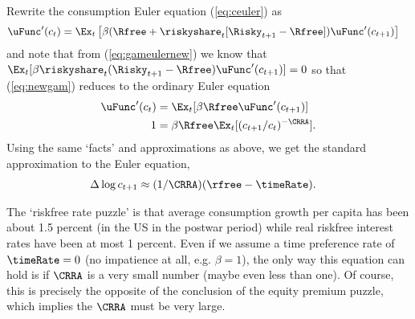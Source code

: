 \documentclass{handout}
\begin{document}

Rewrite the consumption Euler equation (\ref{eq:ceuler}) as 
\begin{equation}\begin{gathered}\begin{aligned}
      \uFunc^{\prime}(c_{t}) & =  \Ex_{t}\left[\beta (\Rfree  + \riskyshare_{t} [\Risky_{t+1} - \Rfree])\uFunc^{\prime}({c}_{t+1})\right] \label{eq:newgam}
    \end{aligned}\end{gathered}\end{equation}
and note that from (\ref{eq:gameulernew}) we know that $\Ex_{t}[\beta 
\riskyshare_{t}(\Risky_{t+1}-\Rfree)\uFunc^{\prime}({c}_{t+1})] = 0$ so that 
(\ref{eq:newgam}) reduces to the ordinary Euler equation
\begin{equation}\begin{gathered}\begin{aligned}
      \uFunc^{\prime}(c_{t}) & =  \Ex_{t}[\beta \Rfree \uFunc^{\prime}({c}_{t+1})]
      \\  1 & =  \beta \Rfree \Ex_{t}[ ({c}_{t+1}/c_{t})^{-\CRRA}].
    \end{aligned}\end{gathered}\end{equation}
Using the same `facts' and approximations as above, we get the 
standard approximation to the Euler equation,
\begin{equation}\begin{gathered}\begin{aligned}
      \Delta \log c_{t+1} & \approx  (1/\CRRA) (\rfree - \timeRate).
    \end{aligned}\end{gathered}\end{equation}

The `riskfree rate puzzle' is that average consumption growth per 
capita has been about 1.5 percent (in the US in the postwar period) 
while real riskfree interest rates have been at most 1 percent.  Even
if we assume a time preference rate of $\timeRate=0$ (no impatience 
at all, e.g. $\beta=1$), the only way this equation can hold is if $\CRRA$ is a
very small number (maybe even less than one).  Of course, this
is precisely the opposite of the conclusion of the equity premium
puzzle, which implies the $\CRRA$ must be very large.
\end{document}
